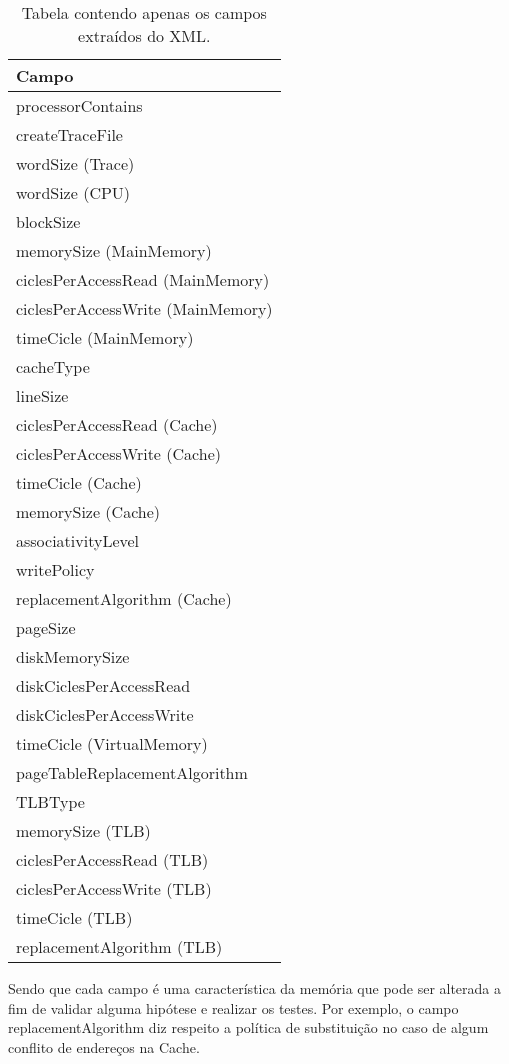 \documentclass[conference]{IEEEtran}
\begin{document}
\begin{table}[h!]
\centering
\begin{tabular}{|l|}
\hline
\textbf{Campo} \\ \hline
processorContains \\ \hline
createTraceFile \\ \hline
wordSize (Trace) \\ \hline
wordSize (CPU) \\ \hline
blockSize \\ \hline
memorySize (MainMemory) \\ \hline
ciclesPerAccessRead (MainMemory) \\ \hline
ciclesPerAccessWrite (MainMemory) \\ \hline
timeCicle (MainMemory) \\ \hline
cacheType \\ \hline
lineSize \\ \hline
ciclesPerAccessRead (Cache) \\ \hline
ciclesPerAccessWrite (Cache) \\ \hline
timeCicle (Cache) \\ \hline
memorySize (Cache) \\ \hline
associativityLevel \\ \hline
writePolicy \\ \hline
replacementAlgorithm (Cache) \\ \hline
pageSize \\ \hline
diskMemorySize \\ \hline
diskCiclesPerAccessRead \\ \hline
diskCiclesPerAccessWrite \\ \hline
timeCicle (VirtualMemory) \\ \hline
pageTableReplacementAlgorithm \\ \hline
TLBType \\ \hline
memorySize (TLB) \\ \hline
ciclesPerAccessRead (TLB) \\ \hline
ciclesPerAccessWrite (TLB) \\ \hline
timeCicle (TLB) \\ \hline
replacementAlgorithm (TLB) \\ \hline
\end{tabular}
\caption{Tabela contendo apenas os campos extraídos do XML.}
\label{tab:xmlcampos}
\end{table}

Sendo que cada campo é uma característica da memória que pode ser alterada a fim de validar alguma hipótese e realizar os testes. Por exemplo, o campo replacementAlgorithm diz respeito a política de substituição no caso de algum conflito de endereços na Cache.
\end{document}

